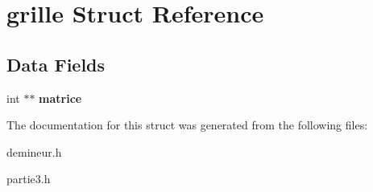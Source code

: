 \hypertarget{structgrille}{
\section{grille Struct Reference}
\label{structgrille}
}
\subsection*{Data Fields}
\begin{DoxyCompactItemize}
\item 
\hypertarget{structgrille_ab2ab181c7c40244a23cb0d8ea084a0df}{
int $\ast$$\ast$ {\bfseries matrice}}
\label{structgrille_ab2ab181c7c40244a23cb0d8ea084a0df}

\end{DoxyCompactItemize}


The documentation for this struct was generated from the following files:\begin{DoxyCompactItemize}
\item 
demineur.h\item 
partie3.h\end{DoxyCompactItemize}
